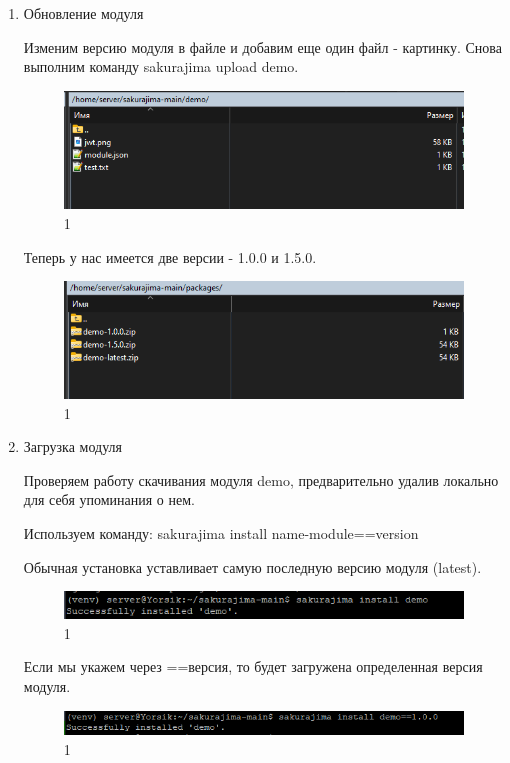 \begin{enumerate}
\item Обновление модуля

Изменим версию модуля в файле и добавим еще один файл - картинку. Снова выполним команду sakurajima upload demo.

\begin{figure}
  \centering
  \includegraphics[width=.8\textwidth]{graphics/test/demo_jwt.png}
  \caption{1}
  \label{fig:test1}
\end{figure}

\newpage

Теперь у нас имеется две версии - 1.0.0 и 1.5.0.

\begin{figure}
  \centering
  \includegraphics[width=.8\textwidth]{graphics/test/demo_jwt_final.png}
  \caption{1}
  \label{fig:test1}
\end{figure}

\item Загрузка модуля

Проверяем работу скачивания модуля demo, предварительно удалив локально для себя упоминания о нем.

Используем команду: sakurajima install name-module==version

Обычная установка уставливает самую последную версию модуля (latest).
\begin{figure}
  \centering
  \includegraphics[width=.8\textwidth]{graphics/test/dev_install.png}
  \caption{1}
  \label{fig:test1}
\end{figure}

Если мы укажем через ==версия, то будет загружена определенная версия модуля.

\begin{figure}
  \centering
  \includegraphics[width=.8\textwidth]{graphics/test/dev_install_ver.png}
  \caption{1}
  \label{fig:test1}
\end{figure}


\end{enumerate}
